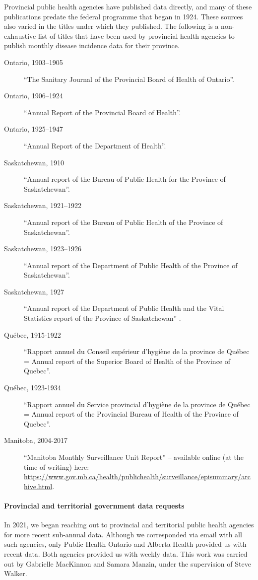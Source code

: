 \documentclass[12pt]{article}
\begin{document}
Provincial public health agencies have published data directly, and many of these publications predate the federal programme that began in 1924. These sources also varied in the titles under which they published. The following is a non-exhaustive list of titles that have been used by provincial health agencies to publish monthly disease incidence data for their province.
\begin{description}
  \item[Ontario, 1903--1905] ``The Sanitary Journal of the Provincial Board of Health of Ontario''.
  \item[Ontario, 1906--1924] ``Annual Report of the Provincial Board of Health''.
  \item[Ontario, 1925--1947] ``Annual Report of the Department of Health''.
  \item[Saskatchewan, 1910] ``Annual report of the Bureau of Public Health for the Province of Saskatchewan''.
  \item[Saskatchewan, 1921--1922] ``Annual report of the Bureau of Public Health of the Province of Saskatchewan''.
  \item[Saskatchewan, 1923--1926] ``Annual report of the Department of Public Health of the Province of Saskatchewan''.
  \item[Saskatchewan, 1927] ``Annual report of the Department of Public Health and the Vital Statistics report of the Province of Saskatchewan'' .
  \item[Québec, 1915-1922] ``Rapport annuel du Conseil supérieur d'hygiène de la province de Québec = Annual report of the Superior Board of Health of the Province of Quebec''.
  \item[Québec, 1923-1934] ``Rapport annuel du Service provincial d'hygiène de la province de Québec = Annual report of the Provincial Bureau of Health of the Province of Quebec''.
  \item[Manitoba, 2004-2017] ``Manitoba Monthly Surveillance Unit Report'' -- available online (at the time of writing) here: \url{https://www.gov.mb.ca/health/publichealth/surveillance/episummary/archive.html}. 
\end{description}

\paragraph*{Provincial and territorial government data requests}

In 2021, we began reaching out to provincial and territorial public health agencies for more recent sub-annual data. Although we corresponded via email with all such agencies, only Public Health Ontario and Alberta Health provided us with recent data. Both agencies provided us with weekly data. This work was carried out by Gabrielle MacKinnon and Samara Manzin, under the supervision of Steve Walker.
\end{document}
